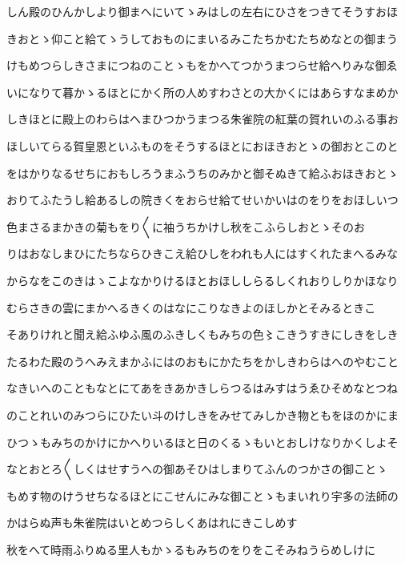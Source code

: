 \documentclass[a4paper,11pt,landscape]{ltjtarticle}
\begin{document}
\par\medskip
しん殿のひんかしより御まへにいてゝみはしの左右にひさをつきてそうすおほ
\par\medskip
きおとゝ仰こと給てゝうしておものにまいるみこたちかむたちめなとの御まう
\par\medskip
けもめつらしきさまにつねのことゝもをかへてつかうまつらせ給へりみな御ゑ
\par\medskip
いになりて暮かゝるほとにかく所の人めすわさとの大かくにはあらすなまめか
\par\medskip
しきほとに殿上のわらはへまひつかうまつる朱雀院の紅葉の賀れいのふる事お
\par\medskip
ほしいてらる賀皇恩といふものをそうするほとにおほきおとゝの御おとこのと
\par\medskip
をはかりなるせちにおもしろうまふうちのみかと御そぬきて給ふおほきおとゝ
\par\medskip
おりてふたうし給あるしの院きくをおらせ給てせいかいはのをりをおほしいつ
\par\medskip
色まさるまかきの菊もをり〱に袖うちかけし秋をこふらしおとゝそのお
\par\medskip
りはおなしまひにたちならひきこえ給ひしをわれも人にはすくれたまへるみな
\par\medskip
からなをこのきはゝこよなかりけるほとおほししらるしくれおりしりかほなり
\par\medskip
むらさきの雲にまかへるきくのはなにこりなきよのほしかとそみるときこ
\par\medskip
そありけれと聞え給ふゆふ風のふきしくもみちの色〻こきうすきにしきをしき
\par\medskip
たるわた殿のうへみえまかふにはのおもにかたちをかしきわらはへのやむこと
\par\medskip
なきいへのこともなとにてあをきあかきしらつるはみすはうゑひそめなとつね
\par\medskip
のことれいのみつらにひたい斗のけしきをみせてみしかき物ともをほのかにま
\par\medskip
ひつゝもみちのかけにかへりいるほと日のくるゝもいとおしけなりかくしよそ
\par\medskip
なとおとろ〱しくはせすうへの御あそひはしまりてふんのつかさの御ことゝ
\par\medskip
もめす物のけうせちなるほとにこせんにみな御ことゝもまいれり宇多の法師の
\par\medskip
かはらぬ声も朱雀院はいとめつらしくあはれにきこしめす
\par\medskip
秋をへて時雨ふりぬる里人もかゝるもみちのをりをこそみねうらめしけに
\par\medskip
\end{document}
